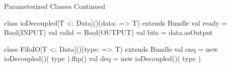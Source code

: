 \documentclass[xcolor=pdflatex,dvipsnames,table]{beamer}
\begin{document}
\begin{frame}[fragile]{Parameterized Classes Continued}
\begin{scala}
class ioDecoupled[T <: Data]()(data: => T) extends Bundle {
  val ready = Bool(INPUT)
  val valid = Bool(OUTPUT)
  val bits  = data.asOutput
}

class FifoIO[T <: Data]()(type: => T) extends Bundle  {
  val enq = new ioDecoupled()( type ).flip()
  val deq = new ioDecoupled()( type )
}
\end{scala}
\end{frame}
\end{document}
